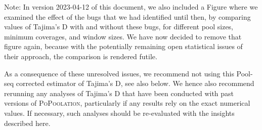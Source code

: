 \documentclass[letterpaper,fontsize=9pt,DIV=12]{scrartcl}
\newcounter{todo}
\newcommand\todo[1]{}
\newcommand\toolname{\textsc}
\newcommand\figref[1]{Figure~\ref{#1}}
\newcommand\eqnref[1]{Eq.~(\ref{#1})}
\newcommand{\coverage}{c}
\begin{document}
\todo{important unmentioned and unresolved bugs:  (1) using min b for the n tilde computation seems super wrong as well.  (2) Harmonic numbers appear in the Achaz formulae, but we plug in the “effective” number of individuals which is generally not an integer. But the usual harmonic numbers are defined only for integers.  (3) the last position of a window is accidentally used as the first of the following instead.}


Note: In version 2023-04-12 of this document, we also included a Figure where we examined the effect of the bugs that we had identified until then, by comparing values of Tajima's D with and without these bugs, for different pool sizes, minimum coverages, and window sizes.  We have now decided to remove that figure again, because with the potentially remaining open statistical issues of their approach, the comparison is rendered futile.

As a consequence of these unresolved issues, we recommend not using this Pool-seq corrected estimator of Tajima's D, see also below.
We hence also recommend rerunning any analyses of Tajima's D that have been conducted with past versions of \toolname{PoPoolation}, particularly if any results rely on the exact numerical values.  If necessary, such analyses should be re-evaluated with the insights described here.
\end{document}
